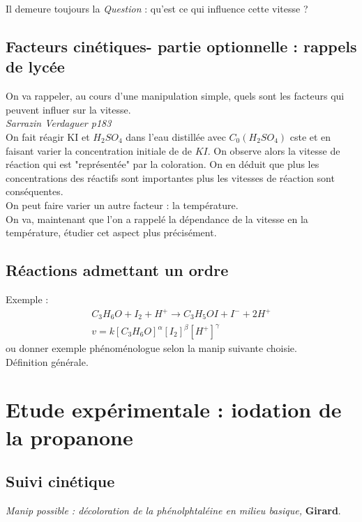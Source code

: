 \documentclass[12pt,prb,aps,epsf]{article}
\begin{document}
Il demeure toujours la \textit{Question} :  qu'est ce qui influence cette vitesse ?

\subsection{Facteurs cinétiques- partie optionnelle : rappels de lycée}
On va rappeler, au cours d'une manipulation simple, quels sont les facteurs qui peuvent influer sur la vitesse. \\

\textit{Sarrazin Verdaguer p183}\\

On fait réagir KI et $H_2SO_4$ dans l'eau distillée avec $C_0(H_2SO_4)$ cste et en faisant varier la concentration initiale de de $KI$. On observe alors la vitesse de réaction qui est "représentée" par la coloration. On en déduit que plus les concentrations des réactifs sont importantes plus les vitesses de réaction sont conséquentes.\\

On peut faire varier un autre facteur : la température.\\

On va, maintenant que l'on a rappelé la dépendance de la vitesse en la température, étudier cet aspect plus précisément.

\subsection{Réactions admettant un ordre}
Exemple :
\begin{eqnarray}
C_3H_6O + I_2 + H^+ \rightarrow C_3H_5OI + I^- + 2H^+\\
v= k[C_3H_6O]^{\alpha}[I_2]^{\beta}[H^+]^{\gamma}
\end{eqnarray}
ou donner exemple phénoménologue selon la manip suivante choisie.\\

	Définition générale.
	
\section{Etude expérimentale : iodation de la propanone}
\subsection{Suivi cinétique}
\textit{Manip possible : décoloration de la phénolphtaléine en milieu basique,} \textbf{Girard}.\\
\end{document}
